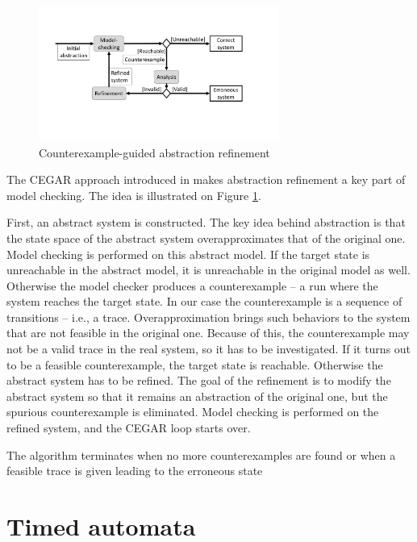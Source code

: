 \begin{figure} [b]
	\centering
	\includegraphics [width=0.7\textwidth] {include/figures/cegar_flow_black}
	\caption{Counterexample-guided abstraction refinement}
	\label{fig:cegar}
\end{figure}

The CEGAR approach introduced in \cite{clarke2003counterexample} makes
abstraction refinement a key part of model checking. The idea is illustrated on
Figure \ref{fig:cegar}.

First, an abstract system is constructed. The key idea behind abstraction is
that the state space of the abstract system overapproximates that of the original
one. 
Model checking is performed on this abstract model. If the target state is
unreachable in the abstract model, it is unreachable in the original model
as well. Otherwise the model checker produces a counterexample -- a run where the
system reaches the target state. In our case the counterexample is a sequence of
transitions -- i.e., a trace. Overapproximation brings such behaviors to the system that are not feasible in the original one. Because of this, the counterexample may not be a valid trace in the real system, so it has to be investigated.
If it turns
out to be a feasible counterexample, the target state is reachable. Otherwise
the abstract system has to be refined. The goal of the refinement is to modify the abstract
system so that it remains an abstraction of the original one, but the spurious
counterexample is eliminated.  Model checking is performed on the
refined system, and the CEGAR loop starts over. 

The algorithm terminates when no more
counterexamples are found or when a feasible trace is
given leading to the erroneous state



\section{Timed automata}


